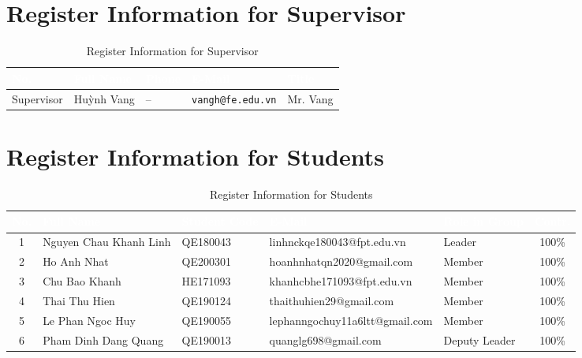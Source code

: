 \documentclass[12pt,a4paper,oneside]{report}
\begin{document}
\section{Register Information for Supervisor}
\begin{table}[H]
\centering
\begin{tabular}{|p{2.2cm}|p{3.8cm}|p{2.5cm}|p{4.3cm}|p{2.2cm}|}
\hline
\rowcolor{PrimaryBrown}
\textcolor{white}{\textbf{No.}} & \textcolor{white}{\textbf{Full Name}} & \textcolor{white}{\textbf{Phone}} & \textcolor{white}{\textbf{E-Mail}} & \textcolor{white}{\textbf{Title}} \\
\hline
Supervisor & Huỳnh Vang & -- & \texttt{vangh@fe.edu.vn} & Mr. Vang \\
\hline
\end{tabular}
\caption{Register Information for Supervisor}
\end{table}

\section{Register Information for Students}
\begin{table}[H]
\centering
\small
\begin{tabular}{|c|p{3.9cm}|p{2.0cm}|p{4.6cm}|p{2.3cm}|c|}
\hline
\rowcolor{PrimaryBrown}
\textcolor{white}{\textbf{No.}} & \textcolor{white}{\textbf{Full Name}} & \textcolor{white}{\textbf{Student Code}} & \textcolor{white}{\textbf{E-Mail}} & \textcolor{white}{\textbf{Role in Group}} & \textcolor{white}{\textbf{Contr.}} \\
\hline
1 & Nguyen Chau Khanh Linh & QE180043 & linhnckqe180043@fpt.edu.vn & Leader & 100\% \\
\hline
2 & Ho Anh Nhat & QE200301 & hoanhnhatqn2020@gmail.com & Member & 100\% \\
\hline
3 & Chu Bao Khanh & HE171093 & khanhcbhe171093@fpt.edu.vn & Member & 100\% \\
\hline
4 & Thai Thu Hien & QE190124 & thaithuhien29@gmail.com & Member & 100\% \\
\hline
5 & Le Phan Ngoc Huy & QE190055 & lephanngochuy11a6ltt@gmail.com & Member & 100\% \\
\hline
6 & Pham Dinh Dang Quang & QE190013 & quanglg698@gmail.com & Deputy Leader & 100\% \\
\hline
\end{tabular}
\caption{Register Information for Students}
\end{table}
\end{document}

